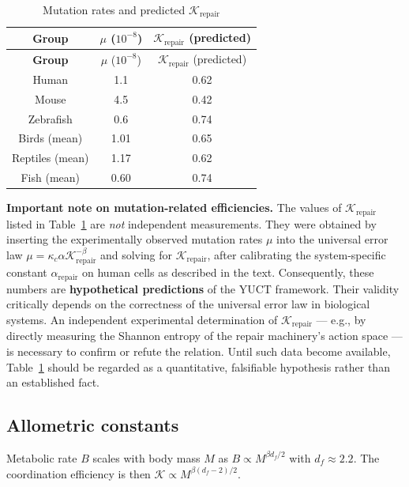 \documentclass[12pt,a4paper]{article}
\newcommand{\REL}{\mathcal{K}}          %
\begin{document}
	\begin{longtable}{|c|c|c|}
		\caption{Mutation rates and predicted \(\REL_{\mathrm{repair}}\)}\label{tab:mutations}\\
		\hline
		\textbf{Group} & \(\mu\) (\(10^{-8}\)) & \(\REL_{\mathrm{repair}}\) (predicted) \\
		\hline
		\endfirsthead
		\hline
		\textbf{Group} & \(\mu\) (\(10^{-8}\)) & \(\REL_{\mathrm{repair}}\) (predicted) \\
		\hline
		\endhead
		\hline
		Human & 1.1 & 0.62 \\
		Mouse & 4.5 & 0.42 \\
		Zebrafish & 0.6 & 0.74 \\
		Birds (mean) & 1.01 & 0.65 \\
		Reptiles (mean) & 1.17 & 0.62 \\
		Fish (mean) & 0.60 & 0.74 \\
		\hline
	\end{longtable}
	
	\noindent\textbf{Important note on mutation‑related efficiencies.}
	The values of \(\REL_{\mathrm{repair}}\) listed in Table~\ref{tab:mutations} are \emph{not} independent measurements.
	They were obtained by inserting the experimentally observed mutation rates \(\mu\) into the universal error law \(\mu = \kappa_c \alpha \REL_{\mathrm{repair}}^{-\beta}\) and solving for \(\REL_{\mathrm{repair}}\), after calibrating the system‑specific constant \(\alpha_{\mathrm{repair}}\) on human cells as described in the text.
	Consequently, these numbers are \textbf{hypothetical predictions} of the YUCT framework.
	Their validity critically depends on the correctness of the universal error law in biological systems.
	An independent experimental determination of \(\REL_{\mathrm{repair}}\) — e.g., by directly measuring the Shannon entropy of the repair machinery’s action space — is necessary to confirm or refute the relation.
	Until such data become available, Table~\ref{tab:mutations} should be regarded as a quantitative, falsifiable hypothesis rather than an established fact.
	
	\subsection{Allometric constants}
	\label{sec:allometry}
	Metabolic rate \(B\) scales with body mass \(M\) as \(B\propto M^{\beta d_f/2}\) with \(d_f\approx2.2\). The coordination efficiency is then \(\REL \propto M^{\beta(d_f-2)/2}\).
	
\end{document}

